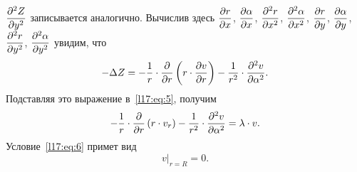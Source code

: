  $\displaystyle\frac{\partial^2Z}{\partial y^2}$ записывается аналогично. Вычислив здесь $\displaystyle\frac{\partial r}{\partial x}$, $\displaystyle\frac{\partial\alpha}{\partial x}$, $\displaystyle\frac{\partial^2r}{\partial x^2}$, $\displaystyle\frac{\partial^2\alpha}{\partial x^2}$, $\displaystyle\frac{\partial r}{\partial y}$, $\displaystyle\frac{\partial\alpha}{\partial y}$, $\displaystyle\frac{\partial^2r}{\partial y^2}$, $\displaystyle\frac{\partial^2\alpha}{\partial y^2}$ увидим, что
\begin{equation*}
	-\Delta Z=-\frac{1}{r}\cdot\frac{\partial}{\partial r}\left(r\cdot\frac{\partial v}{\partial r}\right)-\frac{1}{r^2}\cdot\frac{\partial^2v}{\partial\alpha^2}.
\end{equation*}
Подставляя это выражение в~\eqref{l17:eq:5}, получим 
\begin{equation}\label{l17:eq:9}
	-\frac{1}{r}\cdot\frac{\partial}{\partial r}\left(r\cdot v_r\right)-\frac{1}{r^2}\cdot\frac{\partial^2v}{\partial\alpha^2}=\lambda\cdot v.
\end{equation}
Условие~\eqref{l17:eq:6} примет вид
\begin{equation}\label{l17:eq:10}
	 v\Big|_{r=R}=0.
\end{equation}

